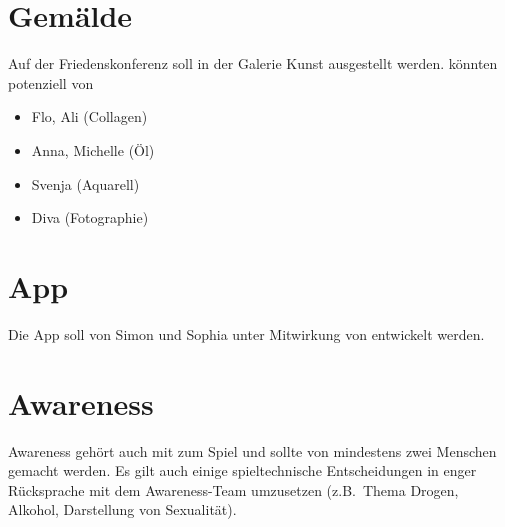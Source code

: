 \section{Gemälde} 
Auf der Friedenskonferenz soll in der Galerie Kunst ausgestellt werden.
 könnten potenziell von 
\begin{itemize} 
  \item Flo, Ali (Collagen) 
  \item Anna, Michelle (Öl)
  \item Svenja (Aquarell) 
  \item Diva (Fotographie)
\end{itemize}

\section{App} 
Die App soll von Simon und Sophia unter Mitwirkung von \creators{} entwickelt
werden.

\section{Awareness}
Awareness gehört auch mit zum Spiel und sollte von mindestens zwei Menschen
gemacht werden. Es gilt auch einige spieltechnische Entscheidungen in enger
Rücksprache mit dem Awareness-Team umzusetzen (z.B.~Thema Drogen, Alkohol,
Darstellung von Sexualität).
